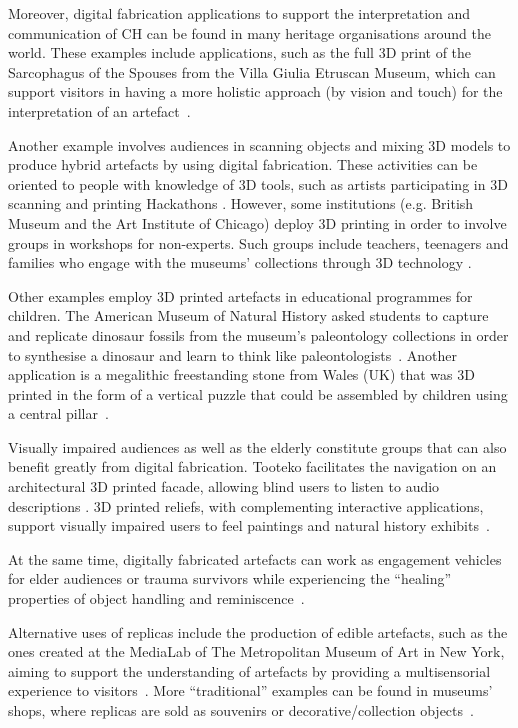 \documentclass[acmlarge,screen,dvipsnames]{acmart}
\begin{document}
Moreover, digital fabrication applications to support the
interpretation and communication of CH can be found in many heritage
organisations around the world. These examples include applications,
such as the full 3D print of the Sarcophagus of the Spouses from the
Villa Giulia Etruscan Museum, which can support visitors in having a
more holistic approach (by vision and touch) for the interpretation of
an artefact~\cite{Guidazzoli2014}.

Another example involves audiences in scanning objects and mixing 3D
models to produce hybrid artefacts by using digital fabrication. These
activities can be oriented to people with knowledge of 3D tools, such
as artists participating in 3D scanning and printing Hackathons
\cite{Mullaney2012,Neely2013}. However, some institutions
(e.g. British Museum and the Art Institute of Chicago) deploy 3D
printing in order to involve groups in workshops for non-experts. Such
groups include teachers, teenagers and families who engage with the
museums' collections through 3D technology
\cite{BritishMuseum2016,Neely2015,Miles2015}.

Other examples employ 3D printed artefacts in educational programmes
for children. The American Museum of Natural History asked students to
capture and replicate dinosaur fossils from the museum's paleontology
collections in order to synthesise a dinosaur and learn to think like
paleontologists~\cite{AMNH2013}. Another application is a megalithic
freestanding stone from Wales (UK) that was 3D printed in the form of
a vertical puzzle that could be assembled by children using a central
pillar~\cite{Miles2015}.

Visually impaired audiences as well as the elderly constitute groups
that can also benefit greatly from digital fabrication. Tooteko
facilitates the navigation on an architectural 3D printed facade,
allowing blind users to listen to audio descriptions
\cite{DAgnano2015}. 3D printed reliefs, with complementing interactive
applications, support visually impaired users to feel paintings and
natural history exhibits~\cite{Reichinger2016a,Samaroudi2017}.

At the same time, digitally fabricated artefacts can work as
engagement vehicles for elder audiences or trauma survivors while
experiencing the ``healing'' properties of object handling and
reminiscence~\cite{PleaseTouch2016}.

Alternative uses of replicas include the production of edible
artefacts, such as the ones created at the MediaLab of The
Metropolitan Museum of Art in New York, aiming to support the
understanding of artefacts by providing a multisensorial experience to
visitors~\cite{Tang2015}. More ``traditional'' examples can be found
in museums' shops, where replicas are sold as souvenirs or
decorative/collection objects~\cite{Young2017}.
\end{document}
